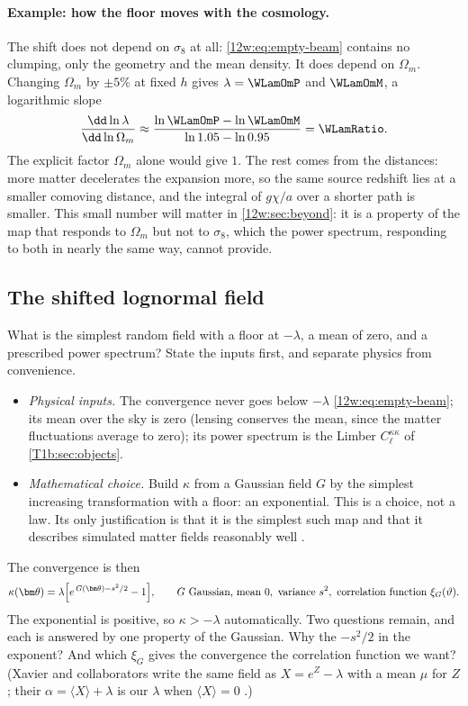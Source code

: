 \paragraph{Example: how the floor moves with the cosmology.}
The shift does not depend on $\sigma_8$ at all: \eqref{12w:eq:empty-beam} contains no clumping, only the
geometry and the mean density. It does depend on $\Omega_m$. Changing $\Omega_m$ by $\pm5\%$ at fixed $h$ gives
$\lambda=\WLamOmP$ and $\WLamOmM$, a logarithmic slope
\[
\frac{\dd\ln\lambda}{\dd\ln\Omega_m}\approx\frac{\ln\WLamOmP-\ln\WLamOmM}{\ln1.05-\ln0.95}=\WLamRatio .
\]
The explicit factor $\Omega_m$ alone would give $1$. The rest comes from the distances: more matter decelerates
the expansion more, so the same source redshift lies at a smaller comoving distance, and the integral of $g\chi/a$
over a shorter path is smaller. This small number will matter in \cref{12w:sec:beyond}: it is a property of the
map that responds to $\Omega_m$ but not to $\sigma_8$, which the power spectrum, responding to both in nearly
the same way, cannot provide.

\subsection{The shifted lognormal field}
\label{12w:sec:lognormal}

What is the simplest random field with a floor at $-\lambda$, a mean of zero, and a prescribed power spectrum?
State the inputs first, and separate physics from convenience.
\begin{itemize}[itemsep=1pt,leftmargin=1.2em]
  \item \emph{Physical inputs.} The convergence never goes below $-\lambda$ \eqref{12w:eq:empty-beam}; its mean
        over the sky is zero (lensing conserves the mean, since the matter fluctuations average to zero); its power
        spectrum is the Limber $C_\ell^{\kappa\kappa}$ of \cref{T1b:sec:objects}.
  \item \emph{Mathematical choice.} Build $\kappa$ from a Gaussian field $G$ by the simplest increasing
        transformation with a floor: an exponential. This is a choice, not a law. Its only justification is that it
        is the simplest such map and that it describes simulated matter fields reasonably well
        \cite{Xavier2016}.
\end{itemize}
The  convergence is then
\begin{equation}
\kappa(\bm\theta)=\lambda\Bigl[e^{\,G(\bm\theta)-s^2/2}-1\Bigr],\qquad
G\ \text{Gaussian, mean }0,\ \text{variance }s^2,\ \text{correlation function }\xi_G(\vartheta).
\label{12w:eq:lognormal}
\end{equation}
The exponential is positive, so $\kappa>-\lambda$ automatically. Two questions remain, and each is answered by one
property of the Gaussian. Why the $-s^2/2$ in the exponent? And which $\xi_G$ gives the convergence the
correlation function we want? (Xavier and collaborators write the same field as $X=e^Z-\lambda$ with a
mean $\mu$ for $Z$; their $\alpha=\langle X\rangle+\lambda$ is our $\lambda$ when $\langle X\rangle=0$
\cite[eqs.~1, 4, 6]{Xavier2016}.)

